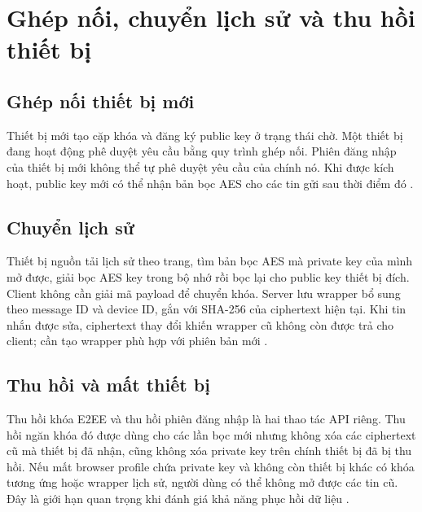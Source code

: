 \section{Ghép nối, chuyển lịch sử và thu hồi thiết bị}
\subsection{Ghép nối thiết bị mới}
Thiết bị mới tạo cặp khóa và đăng ký public key ở trạng thái chờ. Một thiết bị đang hoạt động phê duyệt yêu cầu bằng quy trình ghép nối. Phiên đăng nhập của thiết bị mới không thể tự phê duyệt yêu cầu của chính nó. Khi được kích hoạt, public key mới có thể nhận bản bọc AES cho các tin gửi sau thời điểm đó \cite{e2ee}.

\subsection{Chuyển lịch sử}
Thiết bị nguồn tải lịch sử theo trang, tìm bản bọc AES mà private key của mình mở được, giải bọc AES key trong bộ nhớ rồi bọc lại cho public key thiết bị đích. Client không cần giải mã payload để chuyển khóa. Server lưu wrapper bổ sung theo message ID và device ID, gắn với SHA-256 của ciphertext hiện tại. Khi tin nhắn được sửa, ciphertext thay đổi khiến wrapper cũ không còn được trả cho client; cần tạo wrapper phù hợp với phiên bản mới \cite{e2ee}.

\subsection{Thu hồi và mất thiết bị}
Thu hồi khóa E2EE và thu hồi phiên đăng nhập là hai thao tác API riêng. Thu hồi ngăn khóa đó được dùng cho các lần bọc mới nhưng không xóa các ciphertext cũ mà thiết bị đã nhận, cũng không xóa private key trên chính thiết bị đã bị thu hồi. Nếu mất browser profile chứa private key và không còn thiết bị khác có khóa tương ứng hoặc wrapper lịch sử, người dùng có thể không mở được các tin cũ. Đây là giới hạn quan trọng khi đánh giá khả năng phục hồi dữ liệu \cite{e2ee}.

